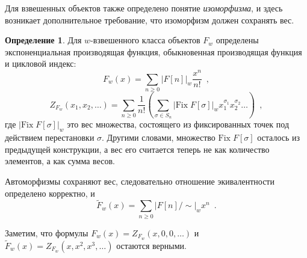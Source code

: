 \documentclass[a5paper]{article}
\theoremstyle{definition}
\newtheorem*{definition}{Определение}
\begin{document}
Для взвешенных объектов также определено понятие \textit{изоморфизма}, и здесь
возникает дополнительное требование, что изоморфизм должен сохранять вес.

\begin{definition}
    Для \(w\)-взвешенного класса объектов \( F_w \) определены экспоненциальная
производящая функция, обыкновенная производящая функция и цикловой индекс:
\[
    F_w(x) = \sum_{n \geq 0} |F[n]|_w \dfrac{x^n}{n!} \enspace ,
\]
\[
    Z_{F_w} (x_1, x_2, \ldots) = \sum_{n \geq 0} \dfrac{1}{n!} \left(
        \sum_{\sigma \in S_n} |\mathrm{Fix}\; F[\sigma]|_w x_1^{\sigma_1}
x_2^{\sigma_2} \ldots
    \right)
    \enspace ,
\]
где \( |\mathrm{Fix}\; F[\sigma]|_w \) это вес множества, состоящего из
фиксированных точек под действием перестановки \( \sigma \). Другими словами,
множество \( \mathrm{Fix}\; F[\sigma] \) осталось из предыдущей конструкции, а
вес его считается теперь не как количество элементов, а как сумма весов.

Автоморфизмы сохраняют вес, следовательно отношение экивалентности определено
корректно, и 
\[
     \widetilde F_w (x) = \sum_{n \geq 0} |F[n] / \sim |_w x^n \enspace .
\]
\end{definition}

Заметим, что формулы \( F_w(x) = Z_{F_w} (x, 0, 0, \ldots) \) и \( \widetilde
F_{w} (x) = Z_{F_w} (x, x^2, x^3, \ldots) \) остаются верными. 
\end{document}
